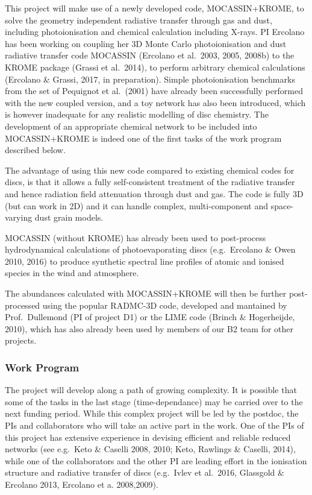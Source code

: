 \documentclass[10pt,fleqn,twoside]{article}
\begin{document}
This project will make use of a newly developed code, MOCASSIN+KROME, to solve the geometry independent radiative transfer through gas  and dust, including photoionisation and chemical calculation
  including X-rays. PI Ercolano has been working on coupling her 3D Monte Carlo photoionisation
and dust radiative transfer code MOCASSIN (Ercolano et al.\ 2003, 2005,
2008b) to the KROME package (Grassi et al.\ 2014), to perform arbitrary
chemical calculations (Ercolano \& Grassi, 2017, in
preparation). Simple photoionisation benchmarks from the set of
Pequignot et al.\ (2001) have already been successfully performed with
the new coupled version, and a toy network has also
been introduced, which is however inadequate for any realistic
modelling of disc chemistry. The development of an appropriate
chemical network to be included into MOCASSIN+KROME is indeed one of
the first tasks of the work program described below.

The advantage of using this new code compared to existing chemical
codes for discs, is that it allows a fully self-consistent treatment
of the radiative transfer and hence radiation field attenuation
through dust and gas. The code is fully 3D (but can work in 2D) and it
can handle complex, multi-component and space-varying dust grain models. 

MOCASSIN (without KROME) has already been used to post-process
hydrodynamical calculations of photoevaporating discs (e.g.\ Ercolano
\& Owen 2010, 2016) to produce synthetic spectral line profiles of
atomic and ionised species in the wind and atmosphere. 

The abundances calculated with MOCASSIN+KROME will then be further
post-processed using the popular RADMC-3D code, developed and mantained
by Prof.\ Dullemond (PI of project D1) or the LIME code (Brinch \&
Hogerheijde, 2010), which has also already been used by members of our
B2 team for other projects. 


\subsubsection{Work Program}


The project will develop along a path of growing complexity. It is possible that some of the tasks in the last stage (time-dependance) may be carried over to the next funding period. While this complex project will be led by the postdoc, the PIs and collaborators who will take an active part in the work. One of the PIs of this project has extensive experience in devising efficient and reliable reduced networks (see e.g.\ Keto \& Caselli 2008, 2010; Keto, Rawlings \& Caselli, 2014), while one of the collaborators and the other PI are leading effort in the ionisation structure and radiative transfer of discs (e.g.\ Ivlev et al.\ 2016, Glassgold \& Ercolano 2013, Ercolano et a. 2008,2009).  
\end{document}
